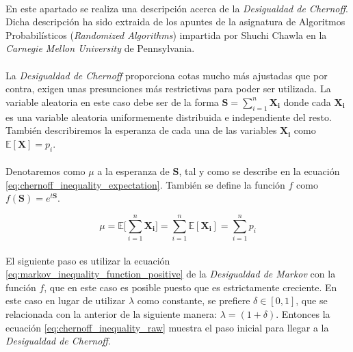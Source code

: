 \documentclass{subfiles}
\begin{document}
        \paragraph{}
        En este apartado se realiza una descripción acerca de la \emph{Desigualdad de Chernoff}. Dicha descripción ha sido extraida de los apuntes de la asignatura de Algoritmos Probabilísticos (\emph{Randomized Algorithms}) \cite{chawla2004chernoff} impartida por Shuchi Chawla en la \emph{Carnegie Mellon University} de Pennsylvania.


        \paragraph{}
        La \emph{Desigualdad de Chernoff} proporciona cotas mucho más ajustadas que por contra, exigen unas presunciones más restrictivas para poder ser utilizada. La variable aleatoria en este caso debe ser de la forma $\boldsymbol{S} = \sum_{i=1}^n \boldsymbol{X_i}$ donde cada $\boldsymbol{X_i}$ es una variable aleatoria uniformemente distribuida e independiente del resto. También describiremos la esperanza de cada una de las variables $\boldsymbol{X_i}$ como $\mathbb{E}[\boldsymbol{X}] = p_i$.

        \paragraph{}
        Denotaremos como $\mu$ a la esperanza de $\boldsymbol{S}$, tal y como se describe en la ecuación \eqref{eq:chernoff_inequality_expectation}. También se define la función $f$ como $f(\boldsymbol{S}) = e^{t\boldsymbol{S}}$.

        \begin{equation}
        \label{eq:chernoff_inequality_expectation}
          \mu = \mathbb{E}\bigg[\sum_{i=1}^n \boldsymbol{X_i}\bigg] = \sum_{i=1}^n  \mathbb{E}[\boldsymbol{X_i}] = \sum_{i=1}^n p_i
        \end{equation}

        \paragraph{}
        El siguiente paso es utilizar la ecuación \eqref{eq:markov_inequality_function_positive} de la \emph{Desigualdad de Markov} con la función $f$, que en este caso es posible puesto que es estrictamente creciente. En este caso en lugar de utilizar $\lambda$ como constante, se prefiere $\delta \in [0,1]$, que se relacionada con la anterior de la siguiente manera: $\lambda = (1 + \delta)$. Entonces la ecuación \eqref{eq:chernoff_inequality_raw} muestra el paso inicial para llegar a la \emph{Desigualdad de Chernoff}.
\end{document}
